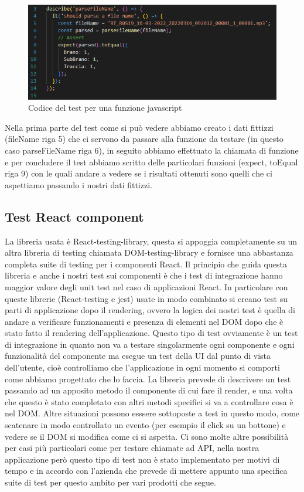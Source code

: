 \begin{figure}[H]
  \centering
  \includegraphics[width=\textwidth]{immagini/test-cronologia.png}
  \caption{Codice del test per una funzione javascript}
\end{figure}

Nella prima parte del test come si può vedere abbiamo creato i dati fittizzi (fileName riga 5) che ci servono da passare alla funzione da testare (in questo caso parseFileName riga 6), in seguito abbiamo effettuato la chiamata di funzione e
per concludere il test abbiamo scritto delle particolari funzioni (expect, toEqual riga 9) con le quali andare a vedere se i risultati ottenuti sono quelli che ci aspettiamo passando i nostri dati fittizzi.

\subsection{Test React component}
La libreria usata è React-testing-library, questa si appoggia completamente su un altra libreria di testing chiamata DOM-testing-library e fornisce una abbastanza completa suite di testing per i componenti React.
Il principio che guida questa libreria e anche i nostri test sui componenti è che i test di integrazione hanno maggior valore degli unit test nel caso di applicazioni React. In particolare con queste librerie (React-testing e jest) usate in modo combinato
si creano test su parti di applicazione dopo il rendering, ovvero la logica dei nostri test è quella di andare a verificare funzionamenti e presenza di elementi nel DOM dopo che è stato fatto il rendering
dell'applicazione. Questo tipo di test ovviamente è un test di integrazione in quanto non va a testare singolarmente ogni componente e ogni funzionalità del componente ma esegue un test della UI dal punto di vista dell'utente, cioè controlliamo che
l'applicazione in ogni momento si comporti come abbiamo progettato che lo faccia.
La libreria prevede di descrivere un test passando ad un apposito metodo il componente di cui fare il render, e una volta che questo è stato completato con altri metodi specifici si va a controllare cosa è nel DOM. Altre situazioni
possono esssere sottoposte a test in questo modo, come scatenare in modo controllato un evento (per esempio il click su un bottone) e vedere se il DOM si modifica come ci si aspetta. Ci sono molte altre possibilità per
casi più particolari come per testare chiamate ad API, nella nostra applicazione però questo tipo di test non è stato implementato per motivi di tempo e in accordo con l'azienda che prevede di mettere appunto
una specifica suite di test per questo ambito per vari prodotti che segue.

